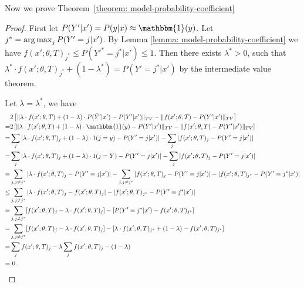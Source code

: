 Now we prove Theorem~\ref{theorem: model-probability-coefficient}
\begin{proof}

First let $P(Y'|x') = P(y|x) \approx \mathbbm{1}(y)$. %
Let $j^* = \operatorname*{arg\,max}_j P(Y'=j|x')$. By Lemma \ref{lemma: model-probability-coefficient} we have $f(x'; \theta, T)_{j^*} \le P(Y'^*=j^*|x') \le 1$. Then there exists $\lambda^* > 0$, such that $\lambda^* \cdot f(x'; \theta, T)_{j^*} + (1 - \lambda^*) = P(Y'=j^* | x')$ by the intermediate value theorem.

Let $\lambda = \lambda^*$, we have
$$
\begin{aligned}
& 2 \left[ \|\lambda \cdot f(x'; \theta, T) + (1 - \lambda) \cdot P(\tilde{Y}' | x')- P(Y' | x')\|_{TV} - \| f(x'; \theta, T) - P(Y' | x')\|_{TV} \right]\\
= & 2 \left[ \|\lambda \cdot f(x'; \theta, T) + (1 - \lambda) \cdot \mathbbm{1}(y)- P(Y' | x')\|_{TV} - \| f(x'; \theta, T) - P(Y' | x')\|_{TV} \right]\\
= & \sum_j |\lambda \cdot f(x'; \theta, T)_j + (1 - \lambda) \cdot 1(j=y) - P(Y' =j | x')| - \sum_j |f(x'; \theta, T)_j - P(Y' =j | x')|\\
= & \sum_j |\lambda \cdot f(x'; \theta, T)_j + (1 - \lambda) \cdot 1(j=Y) - P(Y' =j | x')| - \sum_j |f(x'; \theta, T)_j - P(Y' =j | x')|\\
= & \sum_{j, j\ne j^*} |\lambda \cdot f(x'; \theta, T)_j - P(Y' = j | x')| - \sum_{j, j\ne j^*} |f(x'; \theta, T)_j - P(Y' = j | x')| - |f(x'; \theta, T)_{j^*} - P(Y' = j^* | x')|\\
\le & \sum_{j, j\ne j^*} |\lambda \cdot f(x'; \theta, T)_j - f(x'; \theta, T)_j| - |f(x'; \theta, T)_{j^*} - P(Y' = j^* | x')| \\
= & \sum_{j, j\ne j^*} [f(x'; \theta, T)_j - \lambda \cdot f(x'; \theta, T)_j ] - [P(Y' = j^* | x') - f(x'; \theta, T)_{j^*}] \\
= & \sum_{j, j\ne j^*} [f(x'; \theta, T)_j - \lambda \cdot f(x'; \theta, T)_j ] - [\lambda \cdot f(x'; \theta, T)_{j^*} + (1 - \lambda) - f(x'; \theta, T)_{j^*}] \\
= & \sum_j f(x'; \theta, T)_j - \lambda \sum_j f(x'; \theta, T)_j - (1-\lambda)\\
= & ~ 0.
\end{aligned}
$$
\end{proof}
